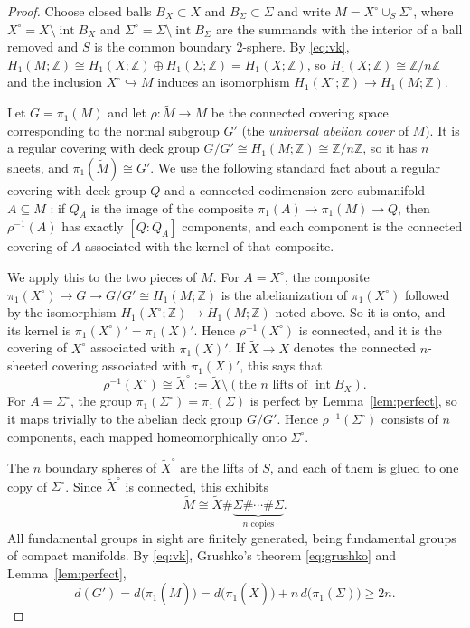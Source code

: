 \documentclass[11pt]{article}
\newcommand{\Z}{\mathbb Z}
\newcommand{\Int}{\operatorname{int}}
\newcommand{\rk}{d}
\theoremstyle{definition}
\theoremstyle{remark}
\begin{document}
\begin{proof}
Choose closed balls \(B_X\subset X\) and \(B_\Sigma\subset\Sigma\) and
write \(M=X^\circ\cup_S\Sigma^\circ\), where
\(X^\circ=X\setminus\Int B_X\) and \(\Sigma^\circ=\Sigma\setminus\Int B_\Sigma\)
are the summands with the interior of a ball removed and \(S\) is the
common boundary \(2\)-sphere. By \eqref{eq:vk},
\(H_1(M;\Z)\cong H_1(X;\Z)\oplus H_1(\Sigma;\Z)=H_1(X;\Z)\), so
\(H_1(X;\Z)\cong\Z/n\Z\) and the inclusion \(X^\circ\hookrightarrow M\)
induces an isomorphism \(H_1(X^\circ;\Z)\to H_1(M;\Z)\).

Let \(G=\pi_1(M)\) and let \(\rho\colon\widetilde M\to M\) be the
connected covering space corresponding to the normal subgroup \(G'\)
(the \emph{universal abelian cover} of \(M\)). It is a regular covering
with deck group \(G/G'\cong H_1(M;\Z)\cong\Z/n\Z\),
so it has \(n\) sheets, and \(\pi_1(\widetilde M)\cong G'\). We use the
following standard fact about a regular covering with deck group \(Q\)
and a connected codimension-zero submanifold \(A\subseteq M\)
\cite[\S1.3]{HatcherAT}: if \(Q_A\) is the image of the composite
\(\pi_1(A)\to\pi_1(M)\to Q\), then \(\rho^{-1}(A)\) has exactly
\([Q:Q_A]\) components, and each component is the connected covering of
\(A\) associated with the kernel of that composite.

We apply this to the two pieces of \(M\). For \(A=X^\circ\), the composite
\(\pi_1(X^\circ)\to G\to G/G'\cong H_1(M;\Z)\) is the abelianization of
\(\pi_1(X^\circ)\) followed by the isomorphism
\(H_1(X^\circ;\Z)\to H_1(M;\Z)\) noted above. So it is onto, and its kernel
is \(\pi_1(X^\circ)'=\pi_1(X)'\). Hence \(\rho^{-1}(X^\circ)\) is
connected, and it is the covering of \(X^\circ\) associated with
\(\pi_1(X)'\). If \(\widetilde X\to X\) denotes the connected
\(n\)-sheeted covering associated with \(\pi_1(X)'\), this says that
\[
 \rho^{-1}(X^\circ)\cong\widetilde X^\circ:=\widetilde X\setminus
 (\text{the \(n\) lifts of }\Int B_X).
\]
For \(A=\Sigma^\circ\), the group \(\pi_1(\Sigma^\circ)=\pi_1(\Sigma)\) is
perfect by Lemma~\ref{lem:perfect}, so it maps trivially to the abelian
deck group \(G/G'\). Hence \(\rho^{-1}(\Sigma^\circ)\) consists of \(n\)
components, each mapped homeomorphically onto \(\Sigma^\circ\).

The \(n\) boundary spheres of \(\widetilde X^\circ\) are the lifts of
\(S\), and each of them is glued to one copy of \(\Sigma^\circ\). Since
\(\widetilde X^\circ\) is connected, this exhibits
\begin{equation}\label{eq:cover-sum}
 \widetilde M\cong
 \widetilde X\#\underbrace{\Sigma\#\cdots\#\Sigma}_{n\text{ copies}}.
\end{equation}
All fundamental groups in sight are finitely generated, being
fundamental groups of compact manifolds. By \eqref{eq:vk}, Grushko's
theorem \eqref{eq:grushko} and Lemma~\ref{lem:perfect},
\[
 \rk(G')=\rk\bigl(\pi_1(\widetilde M)\bigr)
 =\rk\bigl(\pi_1(\widetilde X)\bigr)+n\,\rk\bigl(\pi_1(\Sigma)\bigr)
 \geq 2n.
\]


\end{proof}
\end{document}
